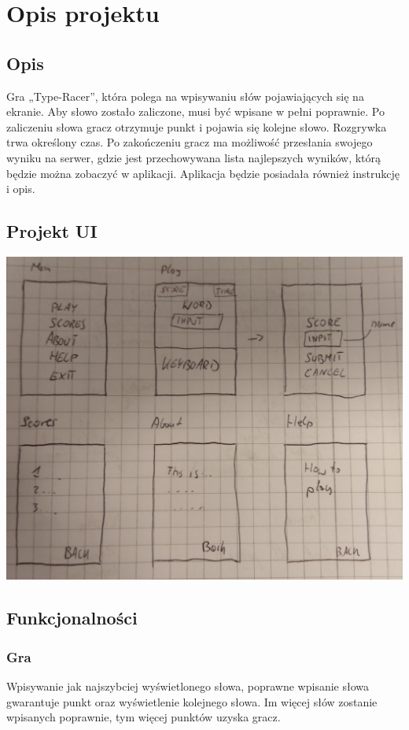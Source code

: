\documentclass[12pt,a4paper]{article}
\begin{document}
	\section{Opis projektu}
		\subsection{Opis}
			Gra „Type-Racer”, która polega na wpisywaniu słów pojawiających się na ekranie. Aby słowo zostało zaliczone, musi być wpisane w pełni poprawnie. Po zaliczeniu słowa gracz otrzymuje punkt i pojawia się kolejne słowo. Rozgrywka trwa określony czas. Po zakończeniu gracz ma możliwość przesłania swojego wyniku na serwer, gdzie jest przechowywana lista najlepszych wyników, którą będzie można zobaczyć w aplikacji. Aplikacja będzie posiadała również instrukcję i opis.

		\subsection{Projekt UI}
			\includegraphics[width=\textwidth]{uiProject.jpg}
			
\clearpage	\subsection{Funkcjonalności}
			\subsubsection{Gra}
			Wpisywanie jak najszybciej wyświetlonego słowa, poprawne wpisanie słowa gwarantuje punkt oraz wyświetlenie kolejnego słowa. Im więcej słów zostanie wpisanych poprawnie, tym więcej punktów uzyska gracz.
\end{document}
